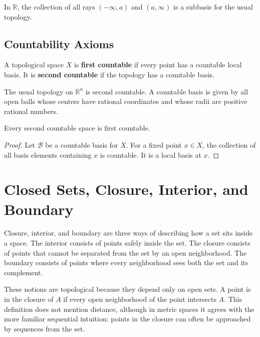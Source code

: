 \begin{example}
In $\mathbb{R}$, the collection of all rays $(-\infty,a)$ and $(a,\infty)$ is a subbasis for the usual topology.
\end{example}

\subsection{Countability Axioms}

\begin{definition}
A topological space $X$ is \textbf{first countable} if every point has a countable local basis. It is \textbf{second countable} if the topology has a countable basis.
\end{definition}

\begin{example}
The usual topology on $\mathbb{R}^n$ is second countable. A countable basis is given by all open balls whose centers have rational coordinates and whose radii are positive rational numbers.
\end{example}

\begin{proposition}
Every second countable space is first countable.
\end{proposition}

\begin{proof}
Let $\mathcal{B}$ be a countable basis for $X$. For a fixed point $x\in X$, the collection of all basis elements containing $x$ is countable. It is a local basis at $x$.
\end{proof}

\section{Closed Sets, Closure, Interior, and Boundary}


Closure, interior, and boundary are three ways of describing how a set sits inside a space. The interior consists of points safely inside the set. The closure consists of points that cannot be separated from the set by an open neighborhood. The boundary consists of points where every neighborhood sees both the set and its complement.

These notions are topological because they depend only on open sets. A point is in the closure of $A$ if every open neighborhood of the point intersects $A$. This definition does not mention distance, although in metric spaces it agrees with the more familiar sequential intuition: points in the closure can often be approached by sequences from the set.

